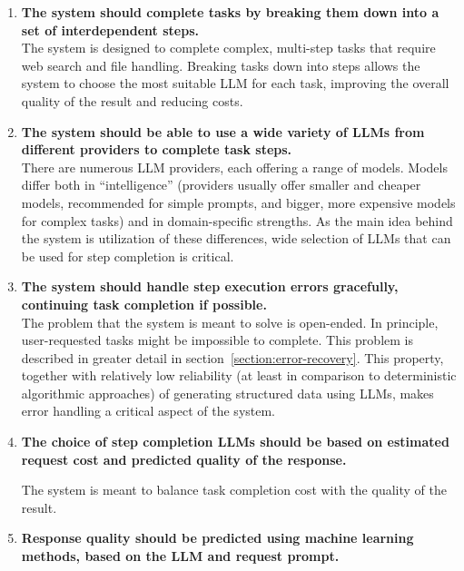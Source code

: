 \documentclass[a4paper,11pt,twoside]{report}
\theoremstyle{definition}
\begin{document}
\begin{enumerate}
    \item \textbf{The system should complete tasks by breaking them down into a set of interdependent steps.} \\
    The system is designed to complete complex, multi-step tasks that require web search and file handling. Breaking tasks down into steps allows the system to choose the most suitable LLM for each task, improving the overall quality of the result and reducing costs.
    \item \textbf{The system should be able to use a wide variety of LLMs from different providers to complete task steps.} \\
    There are numerous LLM providers, each offering a range of models. Models differ both in ``intelligence'' (providers usually offer smaller and cheaper models, recommended for simple prompts, and bigger, more expensive models for complex tasks) and in domain-specific strengths. As the main idea behind the system is utilization of these differences, wide selection of LLMs that can be used for step completion is critical.
    \item \textbf{The system should handle step execution errors gracefully, continuing task completion if possible.} \\
    The problem that the system is meant to solve is open-ended. In principle, user-requested tasks might be impossible to complete. This problem is described in greater detail in section~\ref{section:error-recovery}. This property, together with relatively low reliability (at least in comparison to deterministic algorithmic approaches) of generating structured data using LLMs, makes error handling a critical aspect of the system.
    \item \textbf{The choice of step completion LLMs should be based on estimated request cost and predicted quality of the response.} 
    
    The system is meant to balance task completion cost with the quality of the result.
    \item \textbf{Response quality should be predicted using machine learning methods, based on the LLM and request prompt.} 
    

\end{enumerate}
\end{document}
